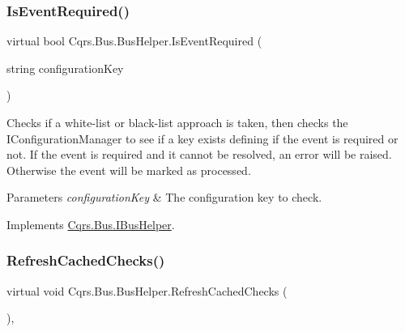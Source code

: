 \subsubsection{\texorpdfstring{Is\+Event\+Required()}{IsEventRequired()}\hspace{0.1cm}{\footnotesize\ttfamily [2/2]}}
{\footnotesize\ttfamily virtual bool Cqrs.\+Bus.\+Bus\+Helper.\+Is\+Event\+Required (\begin{DoxyParamCaption}\item[{string}]{configuration\+Key }\end{DoxyParamCaption})\hspace{0.3cm}{\ttfamily [virtual]}}



Checks if a white-\/list or black-\/list approach is taken, then checks the I\+Configuration\+Manager to see if a key exists defining if the event is required or not. If the event is required and it cannot be resolved, an error will be raised. Otherwise the event will be marked as processed. 


\begin{DoxyParams}{Parameters}
{\em configuration\+Key} & The configuration key to check.\\
\hline
\end{DoxyParams}


Implements \hyperlink{interfaceCqrs_1_1Bus_1_1IBusHelper_af73d0d2aa8e98566acb4b2fb13a3e986_af73d0d2aa8e98566acb4b2fb13a3e986}{Cqrs.\+Bus.\+I\+Bus\+Helper}.

\mbox{\label{classCqrs_1_1Bus_1_1BusHelper_ad589391a51cd61673d2403ee8012e713_ad589391a51cd61673d2403ee8012e713}} 
\subsubsection{\texorpdfstring{Refresh\+Cached\+Checks()}{RefreshCachedChecks()}}
{\footnotesize\ttfamily virtual void Cqrs.\+Bus.\+Bus\+Helper.\+Refresh\+Cached\+Checks (\begin{DoxyParamCaption}{ }\end{DoxyParamCaption})\hspace{0.3cm}{\ttfamily [protected]}, {\ttfamily [virtual]}}



